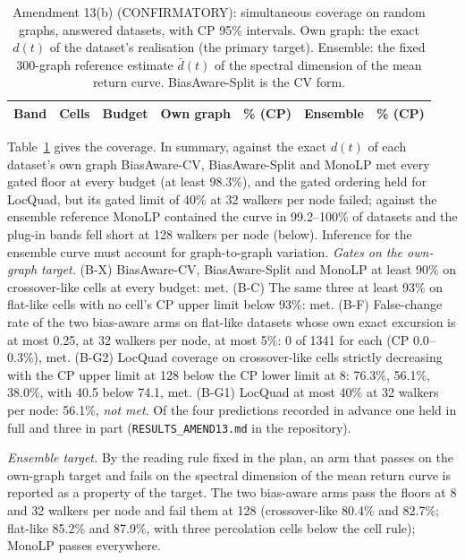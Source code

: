 \documentclass[aps,pre,twocolumn,superscriptaddress,nofootinbib,10pt]{revtex4-2}
\newcommand{\nm}[1]{\textsf{#1}}
\newcommand{\LQ}{\nm{LocQuad}}
\newcommand{\BAC}{\nm{BiasAware-CV}}
\newcommand{\MLP}{\nm{MonoLP}}
\newcommand{\BAS}{\nm{BiasAware-Split}}
\begin{document}
\begin{table}[t]
\caption{Amendment 13(b) (CONFIRMATORY): simultaneous coverage on random graphs, answered datasets, with CP 95\% intervals. Own graph: the exact $d(t)$ of the dataset's realisation (the primary target). Ensemble: the fixed 300-graph reference estimate $\bar d(t)$ of the spectral dimension of the mean return curve. \textsf{BiasAware-Split} is the CV form.}
\label{tab:a13b}
\begin{ruledtabular}
\scriptsize
\begin{tabular}{llrrlrl}
Band & Cells & Budget & Own graph & \% (CP) & Ensemble & \% (CP) \\
\hline

\end{tabular}
\end{ruledtabular}
\end{table}

Table~\ref{tab:a13b} gives the coverage. In summary, against the exact $d(t)$ of each dataset's own graph \BAC{}, \BAS{} and \MLP{} met every gated floor at every budget (at least 98.3\%), and the gated ordering held for \LQ{}, but its gated limit of 40\% at 32 walkers per node failed; against the ensemble reference \MLP{} contained the curve in 99.2--100\% of datasets and the plug-in bands fell short at 128 walkers per node (below). Inference for the ensemble curve must account for graph-to-graph variation. \emph{Gates on the own-graph target.} (B-X) \textsf{BiasAware-CV}, \textsf{BiasAware-Split} and \textsf{MonoLP} at least 90\% on crossover-like cells at every budget: met. (B-C) The same three at least 93\% on flat-like cells with no cell's CP upper limit below 93\%: met. (B-F) False-change rate of the two bias-aware arms on flat-like datasets whose own exact excursion is at most 0.25, at 32 walkers per node, at most 5\%: 0 of 1341 for each (CP 0.0--0.3\%), met. (B-G2) \textsf{LocQuad} coverage on crossover-like cells strictly decreasing with the CP upper limit at 128 below the CP lower limit at 8: 76.3\%, 56.1\%, 38.0\%, with 40.5 below 74.1, met. (B-G1) \textsf{LocQuad} at most 40\% at 32 walkers per node: 56.1\%, \emph{not met}. Of the four predictions recorded in advance one held in full and three in part (\texttt{RESULTS\_AMEND13.md} in the repository).

\emph{Ensemble target.} By the reading rule fixed in the plan, an arm that passes on the own-graph target and fails on the spectral dimension of the mean return curve is reported as a property of the target. The two bias-aware arms pass the floors at 8 and 32 walkers per node and fail them at 128 (crossover-like 80.4\% and 82.7\%; flat-like 85.2\% and 87.9\%, with three percolation cells below the cell rule); \textsf{MonoLP} passes everywhere.
\end{document}
